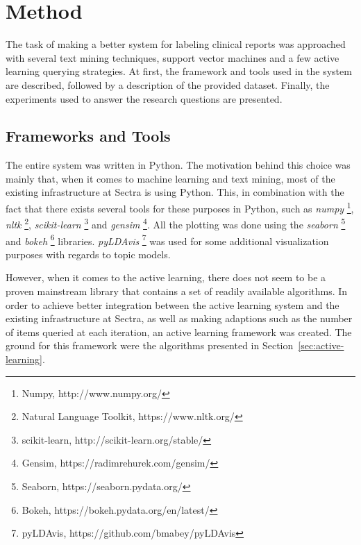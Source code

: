 \chapter{Method}
\label{cha:method}

%

The task of making a better system for labeling clinical reports was approached with several text mining techniques, support vector machines and a few active learning querying strategies.
At first, the framework and tools used in the system are described, followed by a description of the provided dataset.
Finally, the experiments used to answer the research questions are presented.

\section{Frameworks and Tools}
The entire system was written in Python.
The motivation behind this choice was mainly that, when it comes to machine learning and text mining, most of the existing infrastructure at Sectra is using Python.
This, in combination with the fact that there exists several tools for these purposes in Python, such as \textit{numpy} \footnote{Numpy, http://www.numpy.org/}, \textit{nltk} \footnote{Natural Language Toolkit, https://www.nltk.org/}, \textit{scikit-learn} \footnote{scikit-learn, http://scikit-learn.org/stable/} and \textit{gensim} \footnote{Gensim, https://radimrehurek.com/gensim/}.
All the plotting was done using the \textit{seaborn} \footnote{Seaborn, https://seaborn.pydata.org/} and \textit{bokeh} \footnote{Bokeh, https://bokeh.pydata.org/en/latest/} libraries.
\textit{pyLDAvis} \footnote{pyLDAvis, https://github.com/bmabey/pyLDAvis} was used for some additional visualization purposes with regards to topic models.

However, when it comes to the active learning, there does not seem to be a proven mainstream library that contains a set of readily available algorithms.
In order to achieve better integration between the active learning system and the existing infrastructure at Sectra, as well as making adaptions such as the number of items queried at each iteration, an active learning framework was created.
The ground for this framework were the algorithms presented in Section~\ref{sec:active-learning}.

